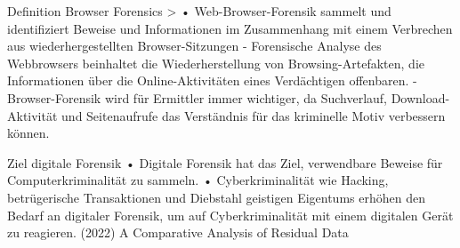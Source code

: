 Definition Browser Forensics
	> \cite{Mahlous.2020} 
		•	Web-Browser-Forensik sammelt und identifiziert Beweise und Informationen im Zusammenhang mit einem Verbrechen aus wiederhergestellten Browser-Sitzungen
		-	Forensische Analyse des Webbrowsers beinhaltet die Wiederherstellung von Browsing-Artefakten, die Informationen über die Online-Aktivitäten eines Verdächtigen offenbaren.
		-	Browser-Forensik wird für Ermittler immer wichtiger, da Suchverlauf, Download-Aktivität und Seitenaufrufe das Verständnis für das kriminelle Motiv verbessern können.
		
Ziel digitale Forensik \cite{Izzati.2022} %
	•	Digitale Forensik hat das Ziel, verwendbare Beweise für Computerkriminalität zu sammeln.
	•	Cyberkriminalität wie Hacking, betrügerische Transaktionen und Diebstahl geistigen Eigentums erhöhen den Bedarf an digitaler Forensik, um auf Cyberkriminalität mit einem digitalen Gerät zu reagieren. (2022) A Comparative Analysis of Residual Data


